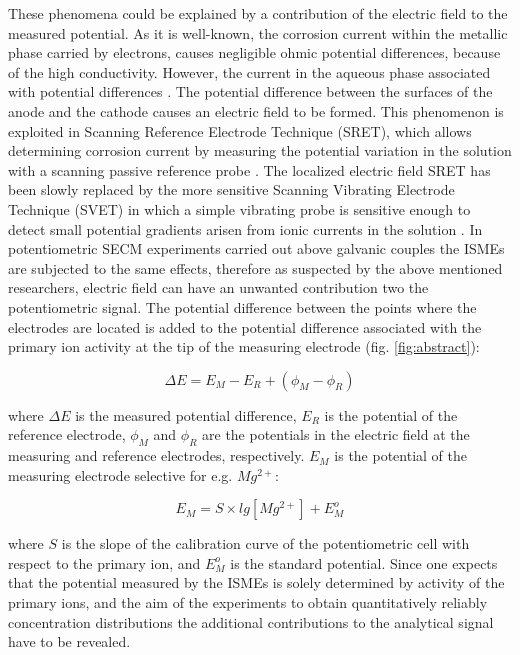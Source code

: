 \documentclass[3p]{elsarticle}
\begin{document}
These phenomena could be explained by a contribution of the electric field to the measured potential. As it is well-known, the corrosion current within the metallic phase carried by electrons, causes negligible ohmic potential differences, because of the high conductivity. However, the current in the aqueous phase associated with potential differences \cite{Isaacsfield}. 
The potential difference between the surfaces of the anode and the cathode causes an electric field to be formed. 
This phenomenon is exploited in Scanning Reference Electrode Technique (SRET), which allows determining corrosion current by measuring the potential variation in the solution with a scanning passive reference probe \cite{SRET1, SRET2, SRET3, SRET4}. 
The localized electric field SRET has been slowly replaced by the more sensitive Scanning Vibrating Electrode Technique (SVET) in which a simple vibrating probe is sensitive enough to detect small potential gradients arisen from ionic currents in the solution \cite{SVET}. 
In potentiometric SECM experiments carried out above galvanic couples the ISMEs are subjected to the same effects, therefore as suspected by the above mentioned researchers, electric field can have an unwanted contribution two the potentiometric signal. 
The potential difference between the points where the electrodes are located is added to the potential difference associated with the primary ion activity at the tip of the measuring electrode (fig. \ref{fig:abstract}):

\begin{equation}
\Delta E=E_M-E_R + (\phi_M - \phi_R)
\label{eq:potential}
\end{equation}

where $\Delta E$ is the measured potential difference, $E_R$ is the potential of the reference electrode, $\phi_M$ and $\phi_R$ are the potentials in the electric field at the measuring and reference electrodes, respectively. $E_M$ is the potential of the measuring electrode selective for e.g. $Mg^{2+}$:

\begin{equation}
E_M = S \times lg[Mg^{2+}] + E_M^o
\label{eq:measuring}
\end{equation}

where $S$ is the slope of the calibration curve of the potentiometric cell with respect to the primary ion, and $E_M^o$ is the standard potential.
Since one expects that the potential measured by the ISMEs is solely determined by activity of the primary ions, and the aim of the experiments to obtain quantitatively reliably concentration distributions the additional contributions to the analytical signal have to be revealed.
\end{document}
